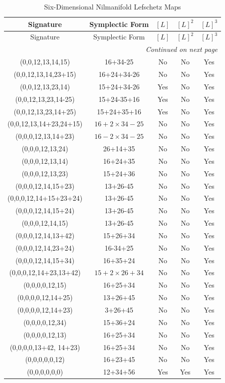\documentclass{amsart}
\theoremstyle{definition}
\begin{document}
\begin{longtable}{|c|c|c|c|c|}
\caption{Six-Dimensional Nilmanifold Lefschetz Maps}
\label{NilTable}\\

\hline
Signature  & Symplectic Form & $[L]$ & $[L]^2$ & $[L]^3$\\
\hline
\endfirsthead

\hline
Signature  & Symplectic Form & $[L]$ & $[L]^2$ & $[L]^3$\\
\hline
\endhead

\hline
\multicolumn{5}{r}{\textit{Continued on next page}} \\
\endfoot

\hline
\endlastfoot

(0,0,12,13,14,15) & 16+34-25 & No & No & Yes\\ \hline
(0,0,12,13,14,23+15) & 16+24+34-26 & No & No& Yes\\ \hline
(0,0,12,13,23,14) & 15+24+34-26 & Yes & No & Yes\\ \hline
(0,0,12,13,23,14-25) & 15+24-35+16  & Yes & No & Yes\\ \hline
(0,0,12,13,23,14+25)  & 15+24+35+16  & Yes  & No & Yes\\ \hline
(0,0,12,13,14+23,24+15)  & $16+2\times 34-25$  & No & No& Yes \\ \hline
(0,0,0,12,13,14+23)  &$16-2\times 34 -25$  & No & No& Yes \\ \hline
(0,0,0,12,13,24) & 26+14+35  & No & No & Yes\\ \hline
(0,0,0,12,13,14)  & 16+24+35 & No & No & Yes\\ \hline
(0,0,0,12,13,23) & 15+24+36 & No & No & Yes\\ \hline
(0,0,0,12,14,15+23) & 13+26-45 & No & No & Yes\\ \hline
(0,0,0,12,14+15+23+24) & 13+26-45 & No & No & Yes\\ \hline 
(0,0,0,12,14,15+24) & 13+26-45 & No & No & Yes\\ \hline
(0,0,0,12,14,15) & 13+26-45 & No & No & Yes\\ \hline
(0,0,0,12,14,13+42) & 15+26+34 & No & No & Yes\\ \hline
(0,0,0,12,14,23+24) & 16-34+25 & No & No & Yes\\ \hline 
(0,0,0,12,14,15+34) & 16+35+24 & No & No & Yes\\ \hline
(0,0,0,12,14+23,13+42) & $15+2 \times 26+34$ & No & No & Yes\\ \hline
(0,0,0,0,12,15) & 16+25+34 & No & No & Yes\\ \hline
(0,0,0,0,12,14+25) & 13+26+45 & No & No & Yes\\ \hline
(0,0,0,0,12,14+23) & 3+26+45 & No & No & Yes\\ \hline
(0,0,0,0,12,34) & 15+36+24 & No & No & Yes\\ \hline 
(0,0,0,0,12,13) & 16+25+34 & No & No & Yes\\ \hline
(0,0,0,0,13+42, 14+23) & 16+25+34 & No & No & Yes\\ \hline
(0,0,0,0,0,12) & 16+23+45 & No & No & Yes\\ \hline
(0,0,0,0,0,0) & 12+34+56 & Yes & Yes & Yes \\ \hline


\end{longtable}
\end{document}
